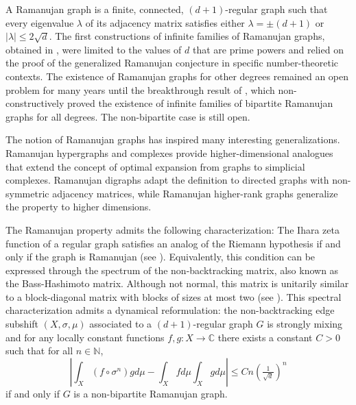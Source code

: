 \documentclass[12pt]{article}
\theoremstyle{definition}
\begin{document}
A Ramanujan graph is a finite, connected, $(d+1)$-regular graph such that every eigenvalue $\lambda$ of its adjacency matrix satisfies either $\lambda=\pm (d+1)$ or $|\lambda|\leq 2\sqrt{d}$. The first constructions of infinite families of Ramanujan graphs, obtained in \cite{RamanujanGraphs1988,Margulis1988,Morgenstern1994}, were limited to the values of $d$ that are prime powers and relied on the proof of the generalized Ramanujan conjecture in specific number-theoretic contexts.
The existence of Ramanujan graphs for other degrees remained an open problem for many years until the breakthrough result of \cite{MarcusSpielmanSrivastava2015}, which non-constructively proved the existence of infinite families of bipartite Ramanujan graphs for all degrees. The non-bipartite case is still open.

The notion of Ramanujan graphs has inspired many interesting generalizations.
Ramanujan hypergraphs and complexes \cite{LiPatrick1996} provide higher-dimensional analogues that extend the concept of optimal expansion from graphs to simplicial complexes.
Ramanujan digraphs \cite{Parzanchevski2020} adapt the definition to directed graphs with non-symmetric adjacency matrices, while Ramanujan higher-rank graphs \cite{LarsenVdovina2024} generalize the property to higher dimensions.

The Ramanujan property admits the following characterization: The Ihara zeta function of a regular graph satisfies an analog of the Riemann hypothesis if and only if the graph is Ramanujan (see \cite{Hashimoto1989}). Equivalently, this condition can be expressed through the spectrum of the non-backtracking matrix, also known as the Bass-Hashimoto matrix. Although not normal, this matrix is unitarily similar to a block-diagonal matrix with blocks of sizes at most two (see \cite{LubetzkyPeres2016}). This spectral characterization admits a dynamical reformulation: the non-backtracking edge subshift $(X,\sigma,\mu)$ associated to a $(d+1)$-regular graph $G$ is strongly mixing and for any locally constant functions $f,g:X\rightarrow\mathbb{C}$ there exists a constant $C>0$ such that for all $n\in\mathbb{N}$,
\begin{equation}\label{eqn:intro_mixing_estimate}
\left|\int_X (f\circ\sigma^n)g d\mu - \int_Xf d\mu\int_Xg d\mu\right|\leq Cn\left(\tfrac{1}{\sqrt{d}}\right)^n
\end{equation}
if and only if $G$ is a non-bipartite Ramanujan graph.
\end{document}
